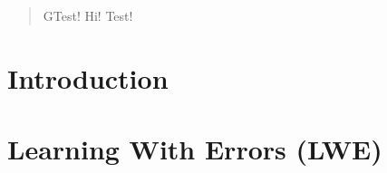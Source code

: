 \documentclass{theme}
\begin{document}
\begin{abstract}
    GTest! Hi! Test!
\end{abstract}

\section{Introduction}

\section{Learning With Errors (LWE)}

\section{}
\end{document}
